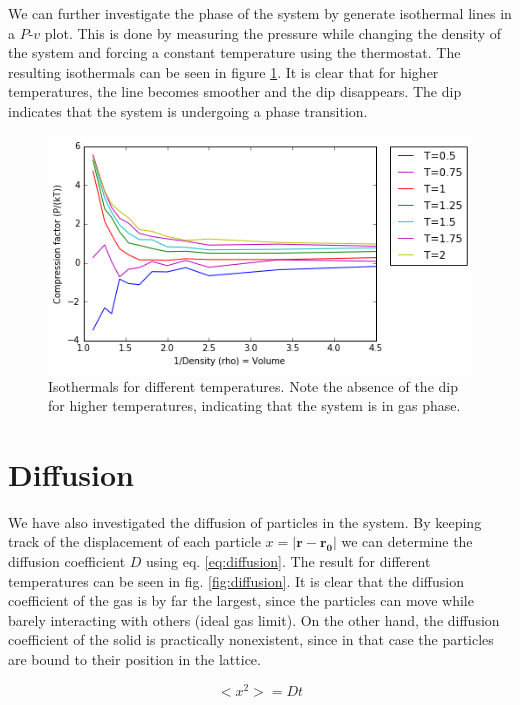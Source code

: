 \documentclass[12pt,a4paper]{report}
\begin{document}
We can further investigate the phase of the system by generate isothermal lines in a $P$-$v$ plot. This is done by measuring the pressure while changing the density of the system and forcing a constant temperature using the thermostat. The resulting isothermals can be seen in figure \ref{fig:isothermals}. It is clear that for higher temperatures, the line becomes smoother and the dip disappears. The dip indicates that the system is undergoing a phase transition.

\begin{figure}[H]
\centering
\includegraphics[scale=0.5]{Isothermen.png}
\caption{Isothermals for different temperatures. Note the absence of the dip for higher temperatures, indicating that the system is in gas phase.}
\label{fig:isothermals}
\end{figure}

\section{Diffusion}

We have also investigated the diffusion of particles in the system.
By keeping track of the displacement of each particle $x = |\mathbf{r}-\mathbf{r_0}|$ we can determine the diffusion coefficient $D$ using eq. \ref{eq:diffusion}. The result for different temperatures can be seen in fig. \ref{fig:diffusion}. It is clear that the diffusion coefficient of the gas is by far the largest, since the particles can move while barely interacting with others (ideal gas limit). On the other hand, the diffusion coefficient of the solid is practically nonexistent, since in that case the particles are bound to their position in the lattice.

\begin{equation}\label{eq:diffusion}
	<x^2> = D t
\end{equation}
\end{document}
